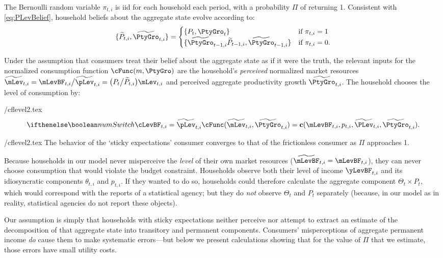 \documentclass[titlepage]{\econtex}
\begin{document}
The Bernoulli random variable $\pi_{t,i}$ is iid for each household each period, with a probability $\Pi$ of returning 1.  Consistent with \eqref{eq:PLevBelief}, household beliefs about the aggregate state evolve according to:
\begin{equation}\label{eq:PLevBeliefSOE}
\{\perc{P}_{t,i},\perc{\PtyGro}_{t,i}\} = \begin{cases}
\{P_t, \PtyGro_t\} & \text{if } \pi_{t,i} = 1 \\
\{\perc{\PtyGro}_{t-1,i} \perc{P}_{t-1,i} , \perc{\PtyGro}_{t-1,i} \} & \text{if } \pi_{t,i} = 0.
\end{cases}
\end{equation}

Under the assumption that consumers treat their belief about the aggregate state as if it were the truth, the relevant inputs for the normalized consumption function $\cFunc(m,\PtyGro)$ are the household's \textit{perceived} normalized market resources $\perc{\mLev}_{t,i} = \mLevBF_{t,i}\big/\perc{\pLev}_{t,i} = \big(P_t\big/\perc{P}_{t,i}\big)\mLev_{t,i}$ and perceived aggregate productivity growth $\perc{\PtyGro}_{t,i}$.  The household chooses the level of consumption by:
\begin{verbatimwrite}{\eq/cflevel2.tex}
\begin{equation*}
 \ifnumSw \cLevBF_{t,i} = \perc{\pLev}_{t,i} \cFunc(\perc{\mLev}_{t,i},\perc{\PtyGro}_{t,i}) = \cFuncLev(\mLevBF_{t,i}, p_{t,i}, \perc{\PLev}_{t,i}, \perc{\PtyGro}_{t,i}). \label{eq:cPerc}
\end{equation*}
\end{verbatimwrite}
 {\eq/cflevel2.tex}
The behavior of the `sticky expectations' consumer converges to that of the frictionless consumer as $\Pi$ approaches 1.

Because households in our model never misperceive the \textit{level} of their own market resources ($\perc{\mLevBF}_{t,i}=\mLevBF_{t,i}$), they can never choose consumption that would violate the budget constraint.  Households observe both their level of income $\yLevBF_{t,i}$ and its idiosyncratic components $\theta_{t,i}$ and ${p}_{t,i}$. If they wanted to do so, households could therefore calculate the aggregate component $\Theta_{t}\times {P}_{t}$, which would correspond with the reports of a statistical agency; but they do \textit{not} observe $\Theta_{t}$ and ${P}_{t}$ separately (because, in our model as in reality, statistical agencies do not report these objects).

Our assumption is simply that households with sticky expectations neither perceive nor attempt to extract an estimate of the decomposition of that aggregate state into transitory and permanent components.  Consumers' misperceptions of aggregate permanent income \textit{do} cause them to make systematic errors---but below we present calculations showing that for the value of $\Pi$ that we estimate, those errors have small utility costs.
\end{document}
